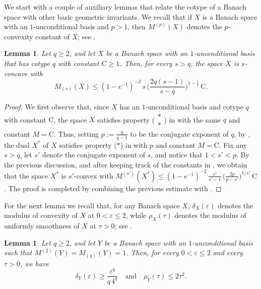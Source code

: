 \documentclass[11pt,leqno]{amsart}
\newtheorem{lemma}[theorem]{Lemma}
\theoremstyle{remark}
\theoremstyle{plain}
\begin{document}
We start with a couple of auxiliary lemmas that relate the cotype of a Banach space with other basic geometric invariants.
We recall that if $X$ is a Banach space with an $1$-unconditional basis and $p>1$, then $M^{(p)}(X)$ denotes the $p$-convexity
constant of $X$; see \cite[Definition 1.d.3]{LT79}.
\begin{lemma} \label{la.4}
Let $q\geqslant 2$, and let $X$ be a Banach space with an $1$-unconditional basis that has cotype $q$ with constant $\mathrm{C}\geqslant 1$.
Then, for every $s>q$, the space $X$ is $s$-concave with
\[ M_{(s)}(X) \leqslant (1-e^{-1})^{-2} \, s\, \Bigg( \frac{2q(s-1)}{s-q}\Bigg)^{1-\frac{1}{s}} \, \mathrm{C}. \]
\end{lemma}
\begin{proof}
We first observe that, since $X$ has an $1$-unconditional basis and cotype $q$ with constant $\mathrm{C}$, the space $X$ satisfies
property ($\substack{\ast \\ \ast}$) in \cite[Definition 1.f.4]{LT79} with the same $q$ and constant $M=\mathrm{C}$. Thus,
setting $p:=\frac{q}{q-1}$ to be the conjugate exponent of $q$, by \cite[Proposition 1.f.5]{LT79}, the dual
$X^*$ of $X$ satisfies property ($\ast$) in \cite[Definition 1.f.4]{LT79} with $p$ and constant $M=\mathrm{C}$.
Fix any $s>q$, let $s'$ denote the conjugate exponent of $s$, and notice that $1<s'<p$. By the previous
discussion, \cite[Theorem 1.f.7]{LT79} and after keeping track of the constants in \cite[Lemma 1.f.8]{LT79},
we obtain that the space $X^*$ is $s'$-convex with
$M^{(s')}(X^*) \leqslant (1-e^{-1})^{-2} \, \frac{s'}{s'-1}\, \big( \frac{2p}{p-s'}\big)^{1/s'} \, \mathrm{C}$.
The proof is completed by combining the previous estimate with \cite[Proposition 1.d.4]{LT79}.
\end{proof}
For the next lemma we recall that, for any Banach space $X$, $\delta_X(\varepsilon)$ denotes the modulus of convexity
of $X$ at $0<\varepsilon \leqslant 2$, while $\rho_X(\tau)$ denotes the modulus of uniformly smoothness of $X$ at $\tau>0$;
see \cite[Definition 1.e.1]{LT79}.
\begin{lemma}\label{la.5}
Let $q\geqslant 2$, and let $Y$ be a Banach space with an $1$-unconditional basis such that $M^{(2)}(Y)=M_{(q)}(Y)=1$.
Then, for every $0<\varepsilon \leqslant 2$ and every $\tau>0$, we have
\begin{equation} \label{ea.7}
\delta_Y(\varepsilon) \geqslant \frac{\varepsilon^q}{q\, 4^q} \ \ \ \text{ and } \ \ \
\rho_Y(\tau) \leqslant 2\tau^2.
\end{equation}
\end{lemma}
\end{document}
